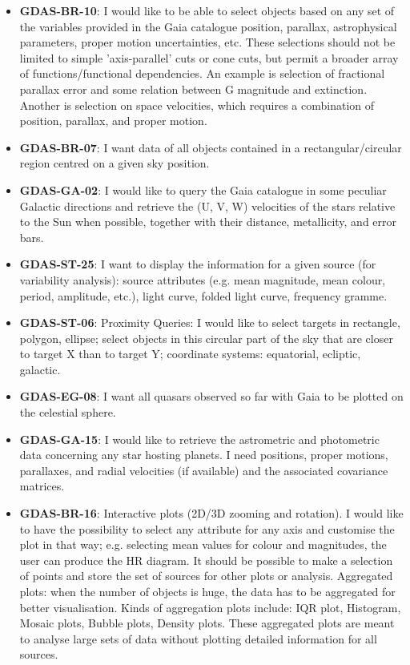 \documentclass[longauth, final]{aa}
\begin{document}
\begin{itemize}
\item{\bf GDAS-BR-10}: I would like to be able to select objects based on any set of the variables provided in the Gaia catalogue position, parallax, astrophysical parameters, proper motion uncertainties, etc. These selections should not be limited to simple 'axis-parallel' cuts or cone cuts, but permit a broader array of functions/functional dependencies. An example is selection of fractional parallax error and some relation between G magnitude and extinction. Another is selection on space velocities, which requires a combination of position, parallax, and proper motion.

\item{\bf GDAS-BR-07}: I want data of all objects contained in a rectangular/circular region centred on a given sky position.

\item{\bf GDAS-GA-02}: I would like to query the Gaia catalogue in some peculiar Galactic directions and retrieve the (U, V, W) velocities of the stars relative to the Sun when possible, together with their distance, metallicity, and error bars.

\item{\bf GDAS-ST-25}: I want to display the information for a given source (for variability analysis): source attributes (e.g. mean magnitude, mean colour, period, amplitude, etc.), light curve, folded light curve, frequency gramme.

\item{\bf GDAS-ST-06}: Proximity Queries: I would like to select targets in rectangle, polygon, ellipse; select objects in this circular part of the sky that are closer to target X than to target Y; coordinate systems: equatorial, ecliptic, galactic.

\item{\bf GDAS-EG-08}: I want all quasars observed so far with Gaia to be plotted on the celestial sphere.

\item{\bf GDAS-GA-15}: I would like to retrieve the astrometric and photometric data concerning any star hosting planets. I need positions, proper motions, parallaxes, and radial velocities (if available) and the associated covariance matrices.

\item{\bf GDAS-BR-16}: Interactive plots (2D/3D zooming and rotation). I would like to have the possibility to select any attribute for any axis and customise the plot in that way; e.g. selecting mean values for colour and magnitudes, the user can produce the HR diagram. It should be possible to make a selection of points and store the set of sources for other plots or analysis. Aggregated plots: when the number of objects is huge, the data has to be aggregated for better visualisation. Kinds of aggregation plots include: IQR plot, Histogram, Mosaic plots, Bubble plots, Density plots. These aggregated plots are meant to analyse large sets of data without plotting detailed information for all sources.


\end{itemize}
\end{document}
